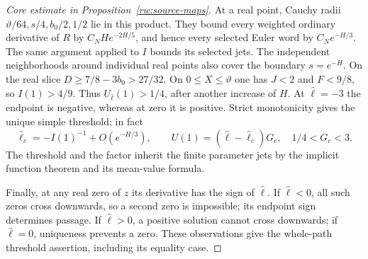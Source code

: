 \begin{proof}[Core estimate in Proposition~\ref{rw:source-maps}]
At a real point, Cauchy radii $\vartheta/64,s/4,b_0/2,1/2$
lie in this product. They bound every weighted ordinary derivative
of $R$ by $C_NH e^{-2H/5}$, and hence every selected Euler word
by $C_Ne^{-H/3}$. The same argument applied to $I$ bounds its
selected jets. The independent neighborhoods around individual real
points also cover the boundary $s=e^{-H}$. On the real slice
$D\ge7/8-3b_0>27/32$.
On $0\le X\le\vartheta$ one has $J<2$ and $F<9/8$, so
$I(1)>4/9$. Thus $U_{\widehat\ell}(1)>1/4$, after another increase of
$H$. At $\widehat\ell=-3$ the endpoint is negative, whereas at zero it
is positive. Strict monotonicity gives the unique simple threshold;
in fact
\[
 \widehat\ell_c=-I(1)^{-1}+O(e^{-H/3}),\qquad
 U(1)=(\widehat\ell-\widehat\ell_c)G_c,\quad 1/4<G_c<3.
\]
The threshold and the factor inherit the finite parameter jets by
the implicit function theorem and its mean-value formula.

Finally, at any real zero of $z$ its derivative has the sign of
$\widehat\ell$. If $\widehat\ell<0$, all such zeros cross downwards, so a
second zero is impossible; its endpoint sign determines passage.
If $\widehat\ell>0$, a positive solution cannot cross downwards; if
$\widehat\ell=0$, uniqueness prevents a zero. These observations give
the whole-path threshold assertion, including its equality case.
\end{proof}

